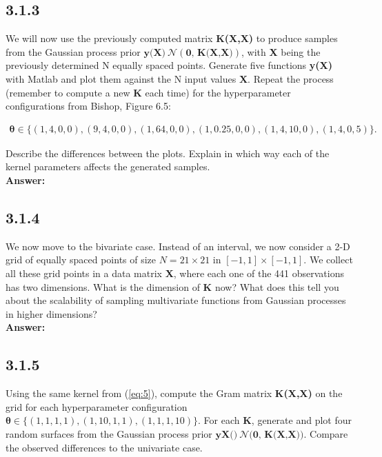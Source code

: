 \documentclass[a4paper]{article}
\begin{document}
\subsection*{3.1.3}

We will now use the previously computed matrix \textbf{K(X,X)} to produce samples from the Gaussian process prior $\textbf{y(X)} ~\mathcal{N}(\textbf{0, K(X,X)})$, with \textbf{X} being the previously determined N equally spaced points. Generate five functions \textbf{y(X)} with Matlab and plot them against the N input values \textbf{X}. Repeat the process (remember to compute a new \textbf{K} each time) for the hyperparameter configurations from Bishop, Figure 6.5:

\begin{align*}
\boldsymbol{\theta} \in \{(1,4,0,0),(9,4,0,0),(1,64,0,0),(1,0.25,0,0),(1,4,10,0),(1,4,0,5)\}.
\end{align*}

Describe the differences between the plots. Explain in which way each of the kernel parameters affects the generated samples.\\


\textbf{Answer:}\\





\subsection*{3.1.4}

We now move to the bivariate case. Instead of an interval, we now consider a 2-D grid of equally spaced points of size $N = 21 \times 21$ in $[-1,1] \times [-1,1]$. We collect all these grid points in a data matrix \textbf{X}, where each one of the 441 observations has two dimensions. What is the dimension of \textbf{K} now? What does this tell you about the scalability of sampling multivariate functions from Gaussian processes in higher dimensions?\\

\textbf{Answer:}\\






\subsection*{3.1.5}

Using the same kernel from (\ref{eq:5}), compute the Gram matrix \textbf{K(X,X)} on the grid for each hyperparameter configuration $\boldsymbol{\theta} \in \{(1, 1, 1, 1), (1, 10, 1, 1), (1, 1, 1, 10)\}$. For each \textbf{K}, generate and plot four random surfaces from the Gaussian process prior $\textbf{yX()} ~\mathcal{N}\textbf{(0, K(X,X)})$. Compare the observed differences to the univariate case.\\
\end{document}

